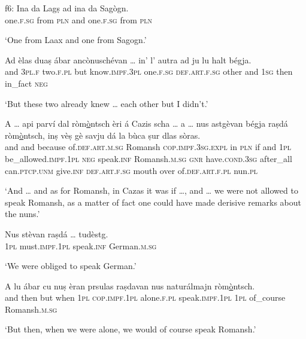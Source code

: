 \begin{linenumbers}
\gll   f6: Ina da Lagṣ ad ina da Sagògn.\\
{}  one.\textsc{f.sg} from \textsc{pln} and one.\textsc{f.sg} from \textsc{pln}\\
\end{linenumbers}
\medskip
\glt `One from Laax and one from Sagogn.'
\medskip

\begin{linenumbers}
\gll    Ad èlas duaṣ ábar ancònuschévan … in’ l’ autra ad ju lu halt bégja.\\
and \textsc{3pl.f} two.\textsc{f.pl} but know.\textsc{impf.3pl} {} one.\textsc{f.sg}  \textsc{def.art.f.sg} other and \textsc{1sg} then in\_fact \textsc{neg}\\
\end{linenumbers}
\medskip
\glt `But these two already knew … each other but I didn’t.'
\medskip

\begin{linenumbers}
\gll    A … api parví dal ròm\underline{ò}ntsch èri á Cazis scha … a … nus astgèvan bégja raṣdá ròm\underline{ò}ntsch, inṣ vèṣ gè savju dá la bùca ṣur dlas sòras.\\
and {} and because of.\textsc{def.art.m.sg} Romansh \textsc{cop.impf.3sg.expl} in \textsc{pln} if {} and {} \textsc{1pl} be\_allowed.\textsc{impf.1pl} \textsc{neg} speak.\textsc{inf} Romansh.\textsc{m.sg} \textsc{gnr}  have.\textsc{cond.3sg} after\_all can.\textsc{ptcp.unm} give.\textsc{inf} \textsc{def.art.f.sg} mouth over of.\textsc{def.art.f.pl} nun.\textsc{pl}\\
\end{linenumbers}
\medskip
\glt `And … and as for Romansh, in Cazas it was if …, and … we were not allowed to speak Romansh, as a matter of fact one could have made derisive remarks about the nuns.'
\medskip

\begin{linenumbers}
\gll    Nus stèvan raṣdá … tudèstg.\\
 \textsc{1pl} must.\textsc{impf.1pl} speak.\textsc{inf} {} German.\textsc{m.sg}\\
\end{linenumbers}
\medskip
\glt `We were obliged to speak German.'
\medskip

\begin{linenumbers}
\gll    A lu ábar cu nuṣ èran prsulas raṣdavan nus naturálmajn ròm\underline{ò}ntsch.\\
and then but when \textsc{1pl} \textsc{cop.impf.1pl} alone.\textsc{f.pl} speak.\textsc{impf.1pl}  \textsc{1pl} of\_course Romansh.\textsc{m.sg}\\
\end{linenumbers}
\medskip
\glt `But then, when we were alone, we would of course speak Romansh.'
\medskip

